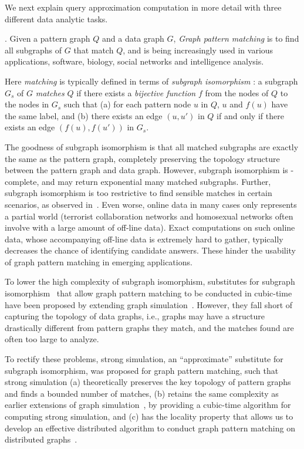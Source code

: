 We next explain query approximation computation in more detail with three different data analytic tasks.



. Given a pattern graph $Q$ and a data graph $G$,
{\em Graph pattern matching} is to find all subgraphs of $G$ that match $Q$, and is being increasingly used in various applications, \eg software, biology, social networks and intelligence analysis.


Here {\em matching} is typically defined in terms of
{\em subgraph isomorphism} \cite{Galla06}:
a subgraph $G_s$ of $G$ {\em matches} $Q$ if
there exists a {\em bijective function} $f$
from the nodes of $Q$ to the nodes in $G_s$ such that (a)  for each
pattern node $u$ in $Q$, $u$ and $f(u)$
have the same label,
and (b) there exists an edge $(u, u')$ in $Q$ if and only
if there exists an edge $(f(u), f(u'))$ in $G_s$.


The goodness of subgraph isomorphism is that all matched subgraphs  are exactly the same as the pattern graph, \ie completely preserving the  topology structure between the pattern graph and data graph. However, subgraph isomorphism is \NP-complete, and may return exponential many matched subgraphs.
Further, subgraph isomorphism is too restrictive to find sensible matches in certain scenarios, as observed in~\cite{FanLMTWW10}. Even worse, online data in many cases only represents a partial world (\eg terrorist collaboration networks and homosexual networks often involve with a large amount of off-line data).
Exact computations on such online data, whose accompanying off-line data is extremely hard to gather, typically decreases the chance of identifying candidate answers.
These hinder the usability of graph pattern matching in emerging applications.


To lower the high complexity of subgraph isomorphism, substitutes for subgraph isomorphism~\cite{FanLMTWW10,FanLMTW11} that allow graph pattern matching to be conducted in cubic-time have been proposed by extending graph simulation~\cite{infsimu95}. However, they fall short of capturing the topology of data graphs, i.e., graphs may have a structure drastically different from pattern graphs they match, and the matches found are often too large to analyze.

To rectify these problems, strong simulation, an ``approximate'' substitute for subgraph isomorphism, was  proposed for graph pattern matching, such that strong simulation (a) theoretically preserves the key topology of pattern graphs and finds a bounded number of matches, (b) retains the same complexity as earlier extensions of graph simulation~\cite{FanLMTWW10,FanLMTW11}, by providing a cubic-time algorithm for computing strong simulation, and (c) has the locality property that allows us to develop an effective distributed algorithm to conduct graph pattern matching on distributed graphs~\cite{tods-MaCFHW14}.

